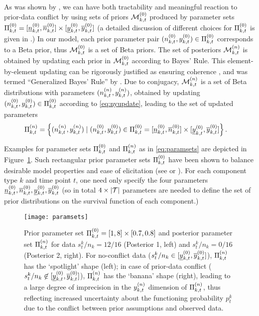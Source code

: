 \documentclass[12pt, a4paper]{elsarticle}
\begin{document}
As was shown by \citet{2009:WalterAugustin}, %
we can have both tractability and meaningful reaction to prior-data conflict
by using sets of priors $\mathcal{M}^{(0)}_{k,t}$ produced by parameter sets $\Pi^{(0)}_{k,t} = [\underline{n}^{(0)}_{k,t}, \overline{n}^{(0)}_{k,t}] \times [\underline{y}^{(0)}_{k,t}, \overline{y}^{(0)}_{k,t}]$
(a detailed discussion of different choices for $\Pi^{(0)}_{k,t}$ is given in \citet[\S 3.1]{2013:diss-gw}.)
In our model, each prior parameter pair $(n^{(0)}_{k,t}, y^{(0)}_{k,t}) \in \Pi^{(0)}_{k,t}$
corresponds to a Beta prior, thus $\mathcal{M}^{(0)}_{k,t}$ is a set of Beta priors.
The set of posteriors $\mathcal{M}^{(n)}_{k,t}$ is obtained by updating each prior in $\mathcal{M}^{(0)}_{k,t}$ according to Bayes' Rule.
This element-by-element updating can be rigorously justified
as ensuring coherence \citep[\S 2.5]{1991:walley}, and was termed ``Generalized Bayes' Rule'' by \citet[\S 6.4]{1991:walley}.
Due to conjugacy, $\mathcal{M}^{(n)}_{k,t}$ is a set of Beta distributions with parameters $(n^{(n)}_{k,t}, y^{(n)}_{k,t})$,
obtained by updating $(n^{(0)}_{k,t}, y^{(0)}_{k,t}) \in \Pi^{(0)}_{k,t}$ according to \eqref{eq:nyupdate},
leading to the set of updated parameters
\begin{align}
\Pi^{(n)}_{k,t} &= \Big\{ (n^{(n)}_{k,t}, y^{(n)}_{k,t}) \mid (n^{(0)}_{k,t}, y^{(0)}_{k,t}) \in \Pi^{(0)}_{k,t} = [\underline{n}^{(0)}_{k,t}, \overline{n}^{(0)}_{k,t}] \times [\underline{y}^{(0)}_{k,t}, \overline{y}^{(0)}_{k,t}] \Big\}\,.
\label{eq:paramsets}
\end{align}

Examples for parameter sets $\Pi^{(0)}_{k,t}$ and $\Pi^{(n)}_{k,t}$ as in \eqref{eq:paramsets} are depicted in Figure~\ref{fig:paramsets}.
Such rectangular prior parameter sets $\Pi^{(0)}_{k,t}$ have been shown
to balance desirable model properties and ease of elicitation 
(see \citet[pp.~123f]{2013:diss-gw} or \citet{Troffaes2013a-short}).
%
For each component type $k$ and time point $t$,
one need only specify the four parameters $\underline{n}^{(0)}_{k,t}, \overline{n}^{(0)}_{k,t}, \underline{y}^{(0)}_{k,t}, \overline{y}^{(0)}_{k,t}$
(so in total $4 \times |{\cal T}|$ parameters are needed to define the set of prior distributions
on the survival function of each component.)

\begin{figure}
\texttt{[image: paramsets]}
\caption{Prior parameter set $\Pi^{(0)}_{k,t} = [1,8] \times [0.7,0.8]$ and posterior parameter set $\Pi^{(n)}_{k,t}$
for data $s^k_t/n_k = 12/16$ (Posterior 1, left) and $s^k_t/n_k = 0/16$ (Posterior 2, right).
For no-conflict data ($s^k_t/n_k \in [\underline{y}^{(0)}_{k,t},\overline{y}^{(0)}_{k,t}]$), $\Pi^{(n)}_{k,t}$ has the `spotlight' shape (left);
in case of prior-data conflict ($s^k_t/n_k \not\in [\underline{y}^{(0)}_{k,t},\overline{y}^{(0)}_{k,t}]$), $\Pi^{(n)}_{k,t}$ has the `banana' shape (right),
leading to a large degree of imprecision in the $y^{(n)}_{k,t}$ dimension of $\Pi^{(n)}_{k,t}$,
thus reflecting increased uncertainty about the functioning probability $p^k_t$
due to the conflict between prior assumptions and observed data.}
\label{fig:paramsets}
\end{figure}
\end{document}
